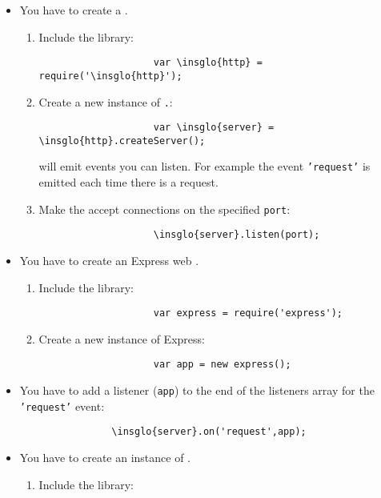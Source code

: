 		\begin{itemize}
			\item You have to create a  .
			\begin{enumerate}
				\item Include the library:
				\begin{lstlisting}
					var \insglo{http} = require('\insglo{http}');
				\end{lstlisting}
				\item Create a new instance of \texttt{.}:
				\begin{lstlisting}
					var \insglo{server} = \insglo{http}.createServer();
				\end{lstlisting}
				\texttt{} will emit events you can listen. For example the event \texttt{'request'} is emitted each time there is a request.
				\item Make the   accept connections on the specified \texttt{port}:
				\begin{lstlisting}
					\insglo{server}.listen(port);
				\end{lstlisting}
			\end{enumerate}
			\item You have to create an Express web .
			\begin{enumerate}
				\item Include the library:
				\begin{lstlisting}
					var express = require('express');
				\end{lstlisting}
				\item Create a new instance of Express:
				\begin{lstlisting}
					var app = new express();
				\end{lstlisting}
			\end{enumerate}
			\item You have to add a listener (\texttt{app}) to the end of the listeners array for the \texttt{'request'} event:
			\begin{lstlisting}
				\insglo{server}.on('request',app);
			\end{lstlisting}
			\item You have to create an instance of .
			\begin{enumerate}
				\item Include the library:
				\begin{lstlisting}

\end{lstlisting}
\end{enumerate}
\end{itemize}
